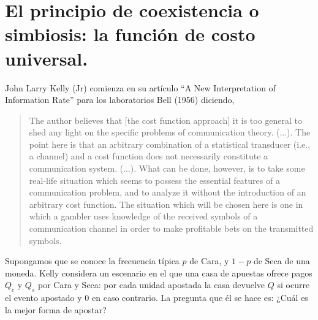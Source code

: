 \documentclass[a4paper,10pt]{book}
\theoremstyle{definition}
\newif\ifen
\newif\ifes
\newcommand{\en}[1]{\ifen#1\fi}
\newcommand{\es}[1]{\ifes#1\fi}
\newcommand{\Ee}{\en{s}\es{e}}
\begin{document}
\es{Cuando el grupo tiene tamaño 1, la estrategia óptima es $\Ee^*=p$. }%
\es{Pero apenas surge la cooperación aparece una ventaja a favor de las estrategias especialistas $\Ee^* > p = 0.71$. }%
%
\es{Cuanto más grande son los grupos, más especialista es vuelve la estrategia óptima. }%
%
\en{At the extremes (cooperative groups of infinite size) the optimal strategy is reached at the maximum level of specialization, $\Ee=1$. }%
\es{En el extremos (grupos cooperativos de tamaño inifinito) la estrategia óptima se alcanza con el nivel de especialización máximo, $\Ee=1$. }%
%
\es{Aquí mostramos que, una vez que la cooperación emerge, las estrategias individualmente mal adaptadas al ambiente (especialistas) consigen superar tanto a las estrategias bien adaptas individualmemte (generalistas), como a sus grupos cooperativos de tamaño infinito. }%

\section{El principio de coexistencia o simbiosis: la función de costo universal.}

John Larry Kelly (Jr) comienza en su artículo ``A New Interpretation of Information Rate'' para los laboratorios Bell (1956) diciendo, 

\begin{quotation}
The author believes that [the cost function approach] it is too general to shed any light on the specific problems of communication theory. (...). The point here is that an arbitrary combination of a statistical transducer (i.e., a channel) and a cost function does not necessarily constitute a communication system. (...). What can be done, however, is to take some real-life situation which seems to possess the essential features of a communication problem, and to analyze it without the introduction of an arbitrary cost function. The situation which
will be chosen here is one in which a gambler uses knowledge of the received symbols of a communication channel in order to make profitable bets on the transmitted symbols.
\end{quotation}

Supongamos que se conoce la frecuencia típica $p$ de Cara, y $1-p$ de Seca de una moneda.
%
Kelly considera un escenario en el que una casa de apuestas ofrece pagos $Q_c$ y $Q_s$ por Cara y Seca: por cada unidad apostada la casa devuelve $Q$ si ocurre el evento apostado y $0$ en caso contrario.
%
La pregunta que él se hace es: ¿Cuál es la mejor forma de apostar?
\end{document}
